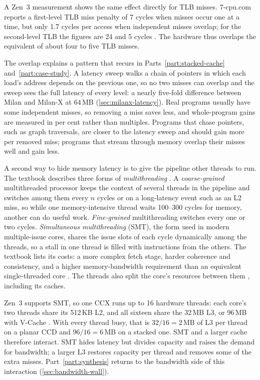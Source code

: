 A Zen~3 measurement shows the same effect directly for TLB misses. 7-cpu.com reports a first-level TLB miss penalty of 7 cycles when misses occur one at a time, but only 1.7 cycles per access when independent misses overlap; for the second-level TLB the figures are 24 and 5 cycles \cite{7-cpu.comAMDZen3}. The hardware thus overlaps the equivalent of about four to five TLB misses.

The overlap explains a pattern that recurs in Parts~\ref{part:stacked-cache} and~\ref{part:case-study}. A latency sweep walks a chain of pointers in which each load's address depends on the previous one, so no two misses can overlap and the sweep sees the full latency of every level: a nearly five-fold difference between Milan and Milan-X at 64\,MB (\cref{sec:milanx-latency}). Real programs usually have some independent misses, so removing a miss saves less, and whole-program gains are measured in per cent rather than multiples. Programs that chase pointers, such as graph traversals, are closer to the latency sweep and should gain more per removed miss; programs that stream through memory overlap their misses well and gain less.

A second way to hide memory latency is to give the pipeline other threads to run. The textbook describes three forms of \emph{multithreading} \cite[sec.~12.4.8]{sarangi2025basic}. A \emph{coarse-grained} multithreaded processor keeps the context of several threads in the pipeline and switches among them every $n$ cycles or on a long-latency event such as an L2 miss, so while one memory-intensive thread waits 100--300 cycles for memory, another can do useful work. \emph{Fine-grained} multithreading switches every one or two cycles. \emph{Simultaneous multithreading} (SMT), the form used in modern multiple-issue cores, shares the issue slots of each cycle dynamically among the threads, so a stall in one thread is filled with instructions from the others. The textbook lists its costs: a more complex fetch stage, harder coherence and consistency, and a higher memory-bandwidth requirement than an equivalent single-threaded core \cite[sec.~12.4.8]{sarangi2025basic}. The threads also split the core's resources between them \cite[sec.~12.4.8, Important Point~20]{sarangi2025basic}, including its caches.

Zen~3 supports SMT, so one CCX runs up to 16 hardware threads: each core's two threads share its 512\,KB L2, and all sixteen share the 32\,MB L3, or 96\,MB with V-Cache \cite[sec.~2.2]{amd2022epyc7003}. With every thread busy, that is $32/16 = 2$\,MB of L3 per thread on a planar CCD and $96/16 = 6$\,MB on a stacked one. SMT and a larger cache therefore interact. SMT hides latency but divides capacity and raises the demand for bandwidth; a larger L3 restores capacity per thread and removes some of the extra misses. Part~\ref{part:synthesis} returns to the bandwidth side of this interaction (\cref{sec:bandwidth-wall}).

